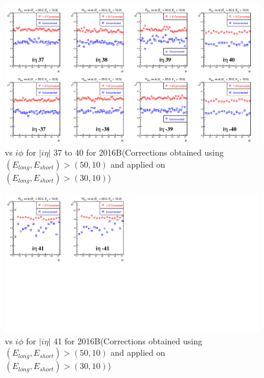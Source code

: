 \begin{figure}[h!]
\centering
\includegraphics[width=0.99\linewidth]{../Figures/Chap2/ImageFiles_HF/Ratio/2016/Corrected/EnegyCut3010/ieta37_40_E1E2Cut1Ietaiphi_Crrtd}
\caption{\ratiosl vs $i\phi$ for $|i\eta|$ 37 to 40 for 2016B(Corrections obtained using $(E_{long},E_{short})>(50,10)$ and applied on $(E_{long},E_{short})>(30,10)$)}
\label{fig:ieta37_40_E1E2Cut1Ietaiphi_Crrtd}
\end{figure}
\begin{figure}[h!]
\centering
\includegraphics[width=0.99\linewidth]{../Figures/Chap2/ImageFiles_HF/Ratio/2016/Corrected/EnegyCut3010/ieta41_E1E2Cut1Ietaiphi_Crrtd}
\caption{\ratiosl vs $i\phi$ for $|i\eta|$ 41 for 2016B(Corrections obtained using $(E_{long},E_{short})>(50,10)$ and applied on $(E_{long},E_{short})>(30,10)$)}
\label{fig:ieta41_E1E2Cut1Ietaiphi_Crrtd}
\end{figure}
\clearpage
